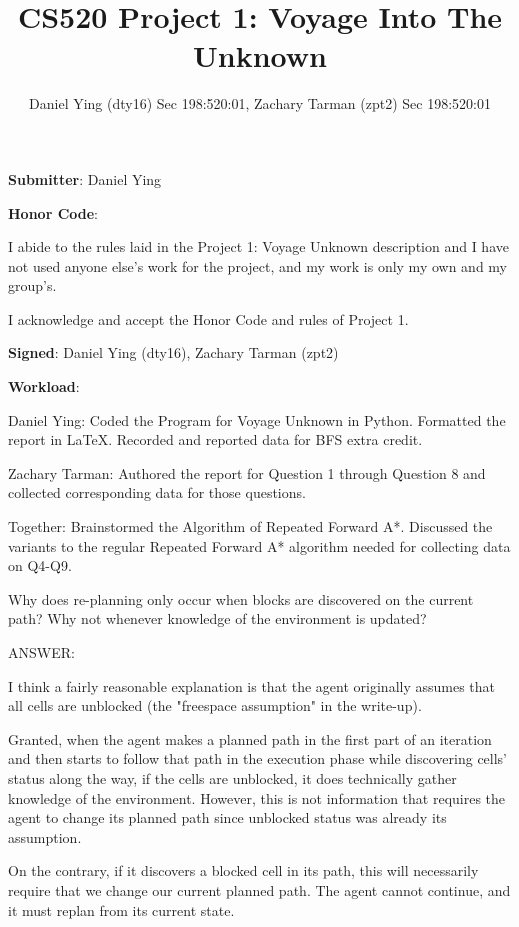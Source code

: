 \documentclass{homeworg}
\title{CS520 Project 1: Voyage Into The Unknown}
\author{Daniel Ying (dty16) Sec 198:520:01, Zachary Tarman (zpt2) Sec 198:520:01}
\begin{document}
\maketitle

\textbf{Submitter}: Daniel Ying

\textbf{Honor Code}:

I abide to the rules laid in the Project 1: Voyage Unknown description and I have not used anyone else’s work for the project, and my work is only my own and my group’s.

\hrulefill

I acknowledge and accept the Honor Code and rules of Project 1.

\textbf{Signed}: Daniel Ying (dty16), Zachary Tarman (zpt2)

\hrulefill

\textbf{Workload}: 

Daniel Ying: Coded the Program for Voyage Unknown in Python. Formatted the report in LaTeX. Recorded and reported data for BFS extra credit.

Zachary Tarman: Authored the report for Question 1 through Question 8 and collected corresponding data for those questions.

Together: Brainstormed the Algorithm of Repeated Forward A*. Discussed the variants to the regular Repeated Forward A* algorithm needed for collecting data on Q4-Q9.
\vspace{.5cm}

\newpage
\exercise
Why does re-planning only occur when blocks are discovered on the current path? Why not whenever knowledge of the environment is updated?

ANSWER:

I think a fairly reasonable explanation is that the agent originally assumes that all cells are unblocked (the "freespace assumption" in the write-up). 

Granted, when the agent makes a planned path in the first part of an iteration and then starts to follow that path in the execution phase while discovering cells' status along the way, if the cells are unblocked, it does technically gather knowledge of the environment. However, this is not information that requires the agent to change its planned path since unblocked status was already its assumption. 

On the contrary, if it discovers a blocked cell in its path, this will necessarily require that we change our current planned path. The agent cannot continue, and it must replan from its current state.
\end{document}
